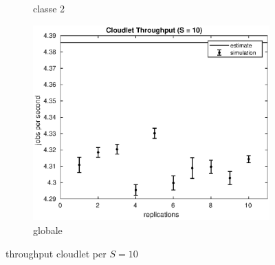 \begin{figure}[!h]
\begin{subfigure}[t]{0.49\textwidth}
\caption{classe 2}
\label{10_x2clet}
\end{subfigure}
%
\begin{subfigure}[t]{0.5\textwidth}
\includegraphics[width=\textwidth]{figures/simul/10_500K_xclet}
\caption{globale}
\label{10_xclet}
\end{subfigure}
%
\caption{throughput cloudlet per $S = 10$}
\end{figure}
%

